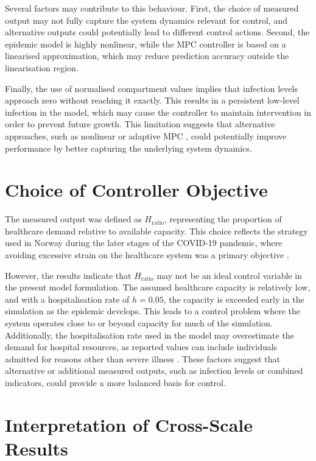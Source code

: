 Several factors may contribute to this behaviour.
First, the choice of measured output may not fully capture the system dynamics relevant for control, and alternative outputs could potentially lead to different control actions.
Second, the epidemic model is highly nonlinear, while the MPC controller is based on a linearised approximation, which may reduce prediction accuracy outside the linearisation region.

Finally, the use of normalised compartment values implies that infection levels approach zero without reaching it exactly.
This results in a persistent low-level infection in the model, which may cause the controller to maintain intervention in order to prevent future growth.
This limitation suggests that alternative approaches, such as nonlinear or adaptive MPC \citep{grune2017}, could potentially improve performance by better capturing the underlying system dynamics.

\section{Choice of Controller Objective}
\label{sec:disc_objective}

The measured output was defined as $H_{\mathrm{ratio}}$, representing the proportion of healthcare demand relative to available capacity.
This choice reflects the strategy used in Norway during the later stages of the COVID-19 pandemic, where avoiding excessive strain on the healthcare system was a primary objective \citep{stoustrup2023}.

However, the results indicate that $H_{\mathrm{ratio}}$ may not be an ideal control variable in the present model formulation.
The assumed healthcare capacity is relatively low, and with a hospitalisation rate of $h = 0.05$, the capacity is exceeded early in the simulation as the epidemic develops.
This leads to a control problem where the system operates close to or beyond capacity for much of the simulation.
Additionally, the hospitalisation rate used in the model may overestimate the demand for hospital resources, as reported values can include individuals admitted for reasons other than severe illness \citep{ariyaratne2025}.
These factors suggest that alternative or additional measured outputs, such as infection levels or combined indicators, could provide a more balanced basis for control.

\section{Interpretation of Cross-Scale Results}
\label{sec:disc_crossscale}

